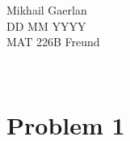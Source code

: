 \documentclass[11pt]{article}
\theoremstyle{definition}
\theoremstyle{remark}
\newcommand{\newquestion}{\hrulefill\vspace{-0.8\baselineskip}\\\null\hrulefill\vspace{-1.0\baselineskip}}
\theoremstyle{plain}
\begin{document}
  \begin{flushright}
    Mikhail Gaerlan\\
    DD MM YYYY\\
    MAT 226B Freund
  \end{flushright}
\vspace{-1.3\baselineskip}


\newquestion
%
%
\section*{Problem 1}
\end{document}

